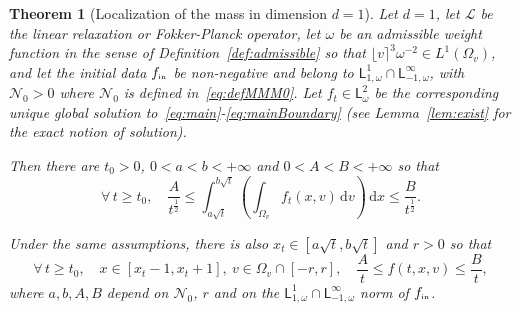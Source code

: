\documentclass[11pt]{amsart}
\newtheorem{theorem}{Theorem}
\theoremstyle{definition}
\theoremstyle{remark}
\numberwithin{equation}{section}
\def\LL{{\mathcal L}}
\def\NN{{\mathcal N}}
\newcommand{\dd}{{\, \mathrm d}}
\newcommand{\init}{\text{{\tiny {\rm in}}}}
\newcommand{\sfL}{\mathsf{L}}
\newcommand{\wangle}[1]{\lfloor #1 \rceil}
\begin{document}
\begin{theorem}[Localization of the mass in dimension $d=1$]
  \label{theo:main2}
  Let $d=1$, let $\LL$ be the linear relaxation or Fokker-Planck operator, let $\omega$ be an admissible weight function in the sense of Definition~\ref{def:admissible} so that $\wangle{v}^3 \omega^{-2} \in L^1(\Omega_v)$, and let the initial data $f_{\init}$ be non-negative and belong to $\sfL^{1}_{1,\omega} \cap \sfL^{\infty}_{-1,\omega}$, with $\mathcal{N}_0 > 0$ where $\mathcal{N}_0$ is defined in~\eqref{eq:defMMM0}. Let $f_t \in \sfL^2_{\omega}$ be the corresponding unique global solution to~\eqref{eq:main}-\eqref{eq:mainBoundary} (see Lemma~\ref{lem:exist} for the exact notion of solution). 
    
  Then there are $t_0 > 0$, $0<a<b<+\infty$ and $0<A<B<+\infty$ so that
  \begin{equation}
    \label{eq:loc-mass-int}
    \forall \, t \ge t_0, \quad \frac{A}{t^{\frac{1}{2}}} \le  \int_{a \sqrt{t}}^{b\sqrt{t}} \left( \int_{\Omega_v} f_t(x,v) \dd v \right)\dd x \le  \frac{B}{t^{\frac{1}{2}}}.
  \end{equation}

  Under the same assumptions, there is also $x_t \in [a \sqrt{t},b \sqrt{t}]$ and $r>0$ so that
  \begin{equation}
    \label{eq:loc-mass}
    \forall \, t \ge t_0, \quad x \in \left[x_t-1,x_t+1\right], \ v \in \Omega_v \cap [-r,r], \quad \frac{A} {t} \le f(t,x,v) \le \frac{B}{t},
  \end{equation}
  where $a,b,A,B$ depend on $\NN_0$, $r$ and on the $\sfL^{1}_{1,\omega} \cap \sfL^{\infty}_{-1,\omega}$ norm of $f_{\init}$. 
\end{theorem}
\end{document}
